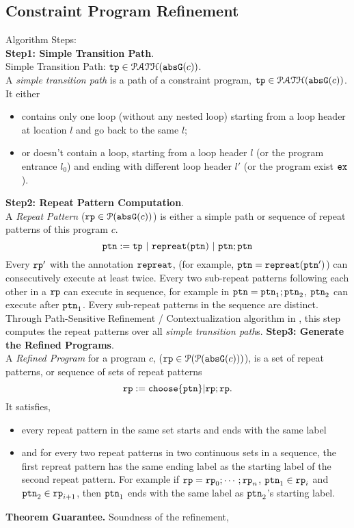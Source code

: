 \subsection{Constraint Program Refinement}
\label{sec:refine}
Algorithm Steps:
\\
\textbf{Step1: Simple Transition Path}.
\\
% 
Simple Transition Path: ${\mathtt{tp}} \in \mathcal{PATH}({\mathtt{abs}}{{\mathtt{G}}}(c))$.
\\
A \emph{simple transition path} is a path of a constraint program, ${\mathtt{tp}} \in \mathcal{PATH}({\mathtt{abs}}{{\mathtt{G}}}(c))$.
It either
\begin{itemize}
  \item contains only one loop (without any nested loop) starting from a loop header at location $l$ and go back to the same $l$;
  \item or doesn't contain a loop, starting from a loop header $l$ (or the program entrance $l_0$)
and ending with different loop header $l'$ (or the program exist ${\mathtt{ex}}$).
\end{itemize}
%
\textbf{Step2: Repeat Pattern Computation}.
\\
A \emph{Repeat Pattern} (${\mathtt{rp}} \in \mathcal{P}({{\mathtt{abs}}{{\mathtt{G}}}(c)})$) is either a simple path or sequence of repeat patterns of this program $c$. 
\[
  {\mathtt{ptn}} := {\mathtt{tp}} ~|~ {\mathtt{repreat}}({\mathtt{ptn}}) ~|~ {\mathtt{ptn}}; {\mathtt{ptn}}
\]
Every ${\mathtt{rp}}'$ with the annotation ${\mathtt{repreat}}$, (for example, ${\mathtt{ptn}} = {\mathtt{repreat}}({\mathtt{ptn}}')$)
can consecutively execute at least twice.
Every two sub-repeat patterns following each other in a ${\mathtt{rp}}$ can execute in sequence, for example in ${\mathtt{ptn}} = {\mathtt{ptn}}_1; {\mathtt{ptn}}_2$,
${\mathtt{ptn}}_2$ can execute after ${\mathtt{ptn}}_1$.
Every sub-repeat patterns in the sequence are distinct.
 \\
Through Path-Sensitive Refinement / Contextualization algorithm in \cite{GulwaniJK09, ZulegerGSV11},
this step computes the repeat patterns over all \emph{simple transition path}s.
\textbf{Step3: Generate the Refined Programs}.
\\
A \emph{Refined Program} for a program $c$, (${\mathtt{rp}} \in \mathcal{P}(\mathcal{P}({\mathtt{abs}}{{\mathtt{G}}}(c)))$),
is a set of repeat patterns, or sequence of sets of  repeat patterns
\[
  \rprog :=  \rpchoose{\rpattern}| \rprog; \rprog.
\]
It satisfies,
\begin{itemize}
  \item every repeat pattern in the same set starts and ends with the same label
  \item and for every two repeat patterns in two continuous sets in a sequence, the first repreat pattern has the same ending label
    as the starting label of the second repeat pattern.
    For example if
    ${\mathtt{rp}} = {\mathtt{rp}}_0; \cdots; {\mathtt{rp}}_n$, ${\mathtt{ptn}}_1 \in {\mathtt{rp}}_i$ and ${\mathtt{ptn}}_2 \in {\mathtt{rp}}_{i + 1}$,
    then ${\mathtt{ptn}}_1$ ends with the same label as ${\mathtt{ptn}}_2$'s starting label.
\end{itemize}
%
\textbf{Theorem Guarantee.}
Soundness of the refinement,
